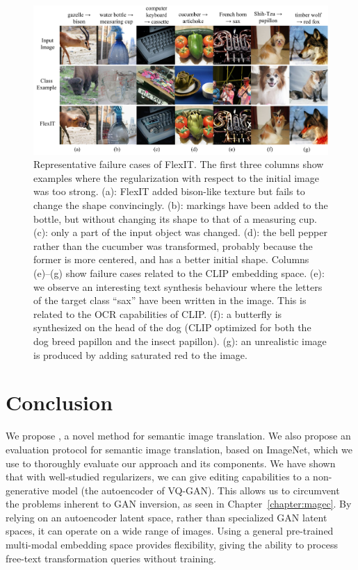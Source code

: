 \begin{figure}[h!]
    \center
    \includegraphics[width=\linewidth]{images/flexit/assets/failures.pdf}
    \caption{
    Representative failure cases of FlexIT. 
    The first three columns show examples where the regularization with respect to the initial image was too strong. (a): FlexIT added bison-like  texture but fails to change  the shape convincingly.
    (b): markings have been added to the  bottle, but without changing its  shape to that  of a measuring cup. 
    (c): only a part of the input object was changed. 
    (d): the bell pepper rather than the cucumber was transformed, probably because the former is more centered, and has a better initial shape. 
    Columns (e)--(g) show failure cases related to the \ac{CLIP} embedding space. 
    (e): we observe an interesting text synthesis behaviour where the letters of the target class ``sax'' have been written in the image. This is related to the OCR capabilities of \ac{CLIP}. 
    (f): a butterfly is synthesized on the head of the dog (\ac{CLIP} optimized for both the dog breed papillon and the insect papillon). 
    (g): an unrealistic image is produced by adding saturated red to the image.
    }
\label{fig:failures}
\end{figure}

\section{Conclusion}

 We propose \ours, a novel method for semantic image translation.
 We also propose an evaluation protocol for semantic image translation, based on ImageNet,
 which we use to thoroughly evaluate our approach and its components.
 We have shown that with well-studied regularizers, we can give editing capabilities 
 to a non-generative model (the autoencoder of VQ-GAN). This allows us to circumvent the 
 problems inherent to \ac{GAN} inversion, as seen in Chapter~\ref{chapter:magec}.
 By relying on an autoencoder latent space, rather than specialized GAN latent spaces,
 it can operate on a wide range of images. Using a general pre-trained multi-modal 
 embedding space provides  flexibility, giving 
 \ours the ability to process free-text transformation queries without training.

